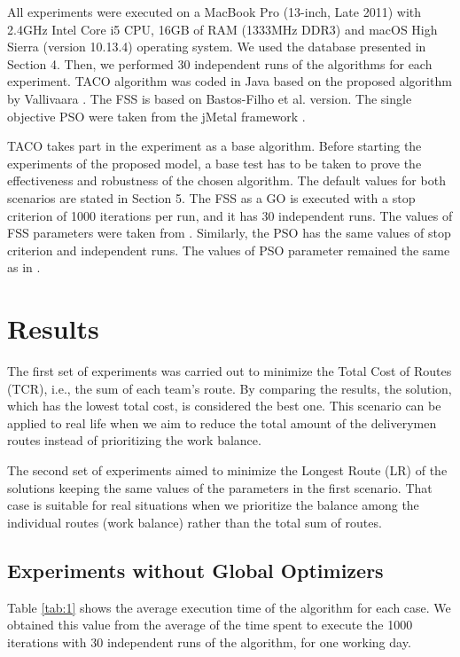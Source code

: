 \documentclass[runningheads]{llncs}
\begin{document}
All experiments were executed on a MacBook Pro (13-inch, Late 2011) with 2.4GHz Intel Core i5 CPU, 16GB of RAM (1333MHz DDR3) and macOS High Sierra (version 10.13.4) operating system. We used the database presented in Section 4. Then, we performed 30 independent runs of the algorithms for each experiment. TACO algorithm was coded in Java based on the proposed algorithm by Vallivaara \cite{vallivaara2008team}. The FSS is based on Bastos-Filho et al. \cite{bastos2008novel} version. The single objective PSO were taken from the jMetal framework \cite{durillo2011jmetal}.

TACO takes part in the experiment as a base algorithm. Before starting the experiments of the proposed model, a base test has to be taken to prove the effectiveness and robustness of the chosen algorithm. The default values for both scenarios are stated in Section 5. The FSS as a GO is executed with a stop criterion of 1000 iterations per run, and it has 30 independent runs. The values of FSS parameters were taken from \cite{bastos2008novel}. Similarly, the PSO has the same values of stop criterion and independent runs. The values of PSO parameter remained the same as in \cite{durillo2011jmetal}.

\section{Results}
The first set of experiments was carried out to minimize the Total Cost of Routes (TCR), i.e., the sum of each team's route. By comparing the results, the solution, which has the lowest total cost, is considered the best one. This scenario can be applied to real life when we aim to reduce the total amount of the deliverymen routes instead of prioritizing the work balance.

The second set of experiments aimed to minimize the Longest Route (LR) of the solutions keeping the same values of the parameters in the first scenario. That case is suitable for real situations when we prioritize the balance among the individual routes (work balance) rather than the total sum of routes.

\subsection{Experiments without Global Optimizers}
Table \ref{tab:1} shows the average execution time of the algorithm for each case. We obtained this value from the average of the time spent to execute the 1000 iterations with 30 independent runs of the algorithm, for one working day.
\end{document}
